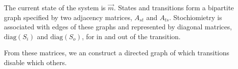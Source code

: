 \documentclass{article}
\begin{document}
The current state of the system is $\vec{m}$.
States and transitions form a bipartite graph
specified by two adjacency matrices, $A_{st}$ and
$A_{ts}$. Stochiomietry is associated with edges
of these graphs and represented by diagonal
matrices, $\mbox{diag}(S_i)$ and $\mbox{diag}(S_o)$,
for in and out of the transition.

From these matrices, we an construct a directed
graph of which transitions disable which others.
\end{document}
